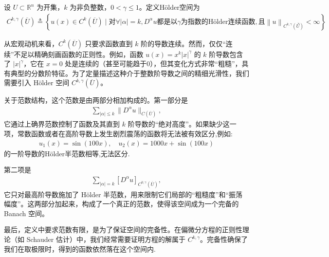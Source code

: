 \documentclass[../../main.tex]{subfiles}
\begin{document}
\begin{definition}\label{definition:ch05-Ckgamma}
设 \(U\subset\mathbb{R}^{n}\) 为开集，\(k\) 为非负整数，\(0<\gamma\leqslant 1\)。定义H\"older空间为
\begin{align*}
C^{k,\gamma}\left( \overline{U} \right) \triangleq \left\{ u\left( x \right) \in C^k\left( \overline{U} \right) \mid \text{对}\forall \left| \alpha \right|=k,D^{\alpha}u\text{都是以}\gamma \text{为指数的H\"older连续函数},\text{且}\left\| u \right\| _{C^{k,\gamma}\left( \overline{U} \right)}<\infty \right\} .
\end{align*}
\end{definition}
\begin{remark}
从宏观动机来看，\(C^k(\overline{U})\) 只要求函数直到 \(k\) 阶的导数连续。然而，仅仅“连续”不足以精确刻画函数的正则性。例如，函数 \(u(x) = x^k |x|^{\gamma}\) 的 \(k\) 阶导数包含了 \(|x|^{\gamma}\)，它在 \(x=0\) 处是连续的（甚至可能趋于0），但其变化方式非常“粗糙”，具有典型的分数阶特征。为了定量描述这种介于整数阶导数之间的精细光滑性，我们需要引入 Hölder 空间 \(C^{k,\gamma}(\overline{U})\)。

关于范数结构，这个范数是由两部分相加构成的。第一部分是
\begin{align*}
\sum_{|\alpha|\leqslant k}\|D^{\alpha}u\|_{C(\overline{U})},
\end{align*}
它通过上确界范数控制了函数及其直到 \(k\) 阶导数的“绝对高度”。如果缺少这一项，常数函数或者在高阶导数上发生剧烈震荡的函数将无法被有效区分,例如:
\begin{align*}
u_1(x)=\sin (100x),\quad u_2(x)=1000x+\sin (100x)
\end{align*}
的一阶导数的H\"older半范数相等,无法区分.

第二项是
\begin{align*}
\sum_{|\alpha|=k}[D^{\alpha}u]_{C^{0,\gamma}(\overline{U})},
\end{align*}
它只对最高阶导数施加了 Hölder 半范数，用来限制它们局部的“粗糙度”和“振荡幅度”。这两部分加起来，构成了一个真正的范数，使得该空间成为一个完备的 Banach 空间。

最后，定义中要求范数有限，是为了保证空间的完备性。在偏微分方程的正则性理论（如 Schauder 估计）中，我们经常需要证明方程的解属于 \(C^{k,\gamma}\)。完备性确保了我们在取极限时，得到的函数依然落在这个空间内.
\end{remark}
\end{document}
